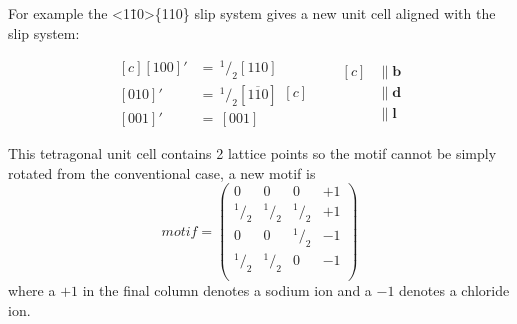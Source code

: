 For example the  <1\={1}0>\{110\} slip system gives a new unit cell aligned with the slip system:

\begin{equation*}
\begin{aligned}[c]
{[100]}' &=\, ^{1}\!/_{2} [110]   \\
{[010]}' &=\, ^{1}\!/_{2} [1\overline{1}0]   \\
{[001]}' &=\, [001]   
\end{aligned}[c]
\qquad
\begin{aligned}[c]
&\parallel \mathbf{b} \\
&\parallel \mathbf{d} \\
&\parallel \mathbf{l}
\end{aligned}
\end{equation*}



This tetragonal unit cell contains 2 lattice points so the motif cannot be simply rotated from the conventional case, a new motif is
$$
motif = \begin{pmatrix}
0 & 0 & 0 & +1 \\
^{1}\!/_{2} & ^{1}\!/_{2} & ^{1}\!/_{2} & +1 \\
0 & 0 & ^{1}\!/_{2} & -1 \\
^{1}\!/_{2} & ^{1}\!/_{2} & 0 & -1 \\
\end{pmatrix}
$$
where a $+1$ in the final column denotes a sodium ion and a $-1$ denotes a chloride ion.



